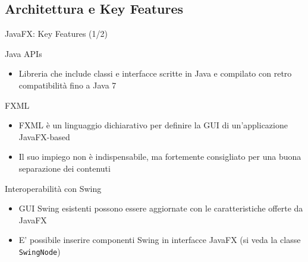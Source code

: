 \documentclass[presentation]{beamer}
\begin{document}

\subsection{Architettura e Key Features}

\begin{frame}{JavaFX: Key Features (1/2)}
\begin{block}{Java APIs}
\begin{itemize}
\item Libreria che include classi e interfacce scritte in Java e compilato con retro compatibilità fino a Java 7
\end{itemize}
\end{block}
%
\begin{block}{FXML}
\begin{itemize}
\item FXML è un linguaggio dichiarativo per definire la GUI di un'applicazione JavaFX-based
\item Il suo impiego non è indispensabile, ma fortemente consigliato per una buona separazione dei contenuti
\end{itemize}
\end{block}
%
\begin{block}{Interoperabilità con Swing}
\begin{itemize}
\item GUI Swing esistenti possono essere aggiornate con le caratteristiche offerte da JavaFX
\item E' possibile inserire componenti Swing in interfacce JavaFX (si veda la classe \texttt{SwingNode})
\end{itemize}
\end{block}
\end{frame}
\end{document}
